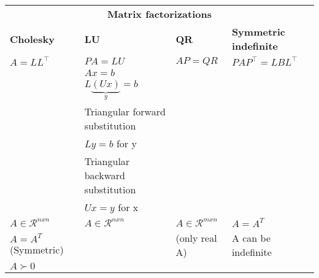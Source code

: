 
\hskip-0.5cm
\begin{tabularx}{\linewidth}{X X X X}
	\multicolumn{4}{c}{\textbf{Matrix factorizations}} \\
	\textbf{Cholesky} & \textbf{LU} & \textbf{QR} & \textbf{Symmetric indefinite}\\
	\hline
	$A = LL^\top$ & $PA = LU$ & $AP = QR$ & $PAP^\top = LBL^\top$\\ %
	\hline
	& $Ax = b$ & &\\
	& $L\underbrace{(Ux)}_{y} = b$ & &\\
	& Triangular forward substitution & &\\
	& $Ly = b$ for y & &\\
	& Triangular backward substitution & &\\
	& $Ux = y$ for x & &\\
	\hline
	$A \in \mathcal{R}^{nxn}$ & $A \in \mathcal{R}^{nxn}$ & $A \in \mathcal{R}^{mxn}$ & $A=A^T$\\
	$A=A^T$ (Symmetric) & & (only real A) & A can be indefinite\\
	$A \succ 0$ & & & \\
\end{tabularx}